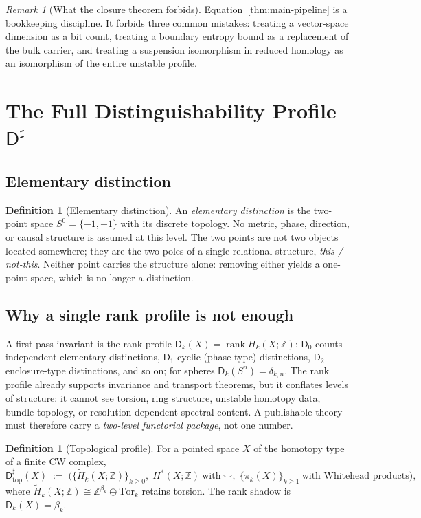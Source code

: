 \documentclass[11pt,a4paper]{article}
\theoremstyle{definition}
\newtheorem{definition}[theorem]{Definition}
\theoremstyle{remark}
\newtheorem{remark}[theorem]{Remark}
\newcommand{\Sn}[1]{S^{#1}}
\newcommand{\Szero}{S^{0}}
\newcommand{\Z}{\mathbb{Z}}
\newcommand{\rH}{\widetilde H}
\newcommand{\Dd}{\mathsf{D}}
\newcommand{\Dsharp}{\mathsf{D}^{\sharp}}
\newcommand{\Dtop}{\mathsf{D}^{\sharp}_{\mathrm{top}}}
\begin{document}
\begin{remark}[What the closure theorem forbids]
Equation~\eqref{thm:main-pipeline} is a bookkeeping discipline.  It forbids three common
mistakes: treating a vector-space dimension as a bit count, treating a boundary entropy bound as
a replacement of the bulk carrier, and treating a suspension isomorphism in reduced homology as
an isomorphism of the entire unstable profile.
\end{remark}


\section{The Full Distinguishability Profile \texorpdfstring{$\Dsharp$}{D-sharp}}
\label{sec:profile}

\subsection{Elementary distinction}

\begin{definition}[Elementary distinction]
An \emph{elementary distinction} is the two-point space $\Szero=\{-1,+1\}$ with its discrete
topology.  No metric, phase, direction, or causal structure is assumed at this level.  The two
points are not two objects located somewhere; they are the two poles of a single relational
structure, \emph{this / not-this}.  Neither point carries the structure alone: removing either
yields a one-point space, which is no longer a distinction.
\end{definition}

\subsection{Why a single rank profile is not enough}

A first-pass invariant is the rank profile
$\Dd_{k}(X)=\operatorname{rank}\rH_{k}(X;\Z)$: $\Dd_{0}$ counts independent elementary
distinctions, $\Dd_{1}$ cyclic (phase-type) distinctions, $\Dd_{2}$ enclosure-type
distinctions, and so on; for spheres $\Dd_{k}(\Sn n)=\delta_{k,n}$.  The rank profile already
supports invariance and transport theorems, but it conflates levels of structure: it cannot see
torsion, ring structure, unstable homotopy data, bundle topology, or resolution-dependent
spectral content.  A publishable theory must therefore carry a \emph{two-level functorial
package}, not one number.

\begin{definition}[Topological profile]
\label{def:dtop}
For a pointed space $X$ of the homotopy type of a finite CW complex,
\begin{equation}
\Dtop(X)\;:=\;
\Big(
\{\rH_{k}(X;\Z)\}_{k\ge0},\;
H^{\ast}(X;\Z)\ \text{with}\ \smile,\;
\{\pi_{k}(X)\}_{k\ge1}\ \text{with Whitehead products}
\Big),
\end{equation}
where $\rH_{k}(X;\Z)\cong\Z^{\beta_{k}}\oplus\mathrm{Tor}_{k}$ retains torsion.  The rank
shadow is $\Dd_{k}(X)=\beta_{k}$.
\end{definition}
\end{document}
